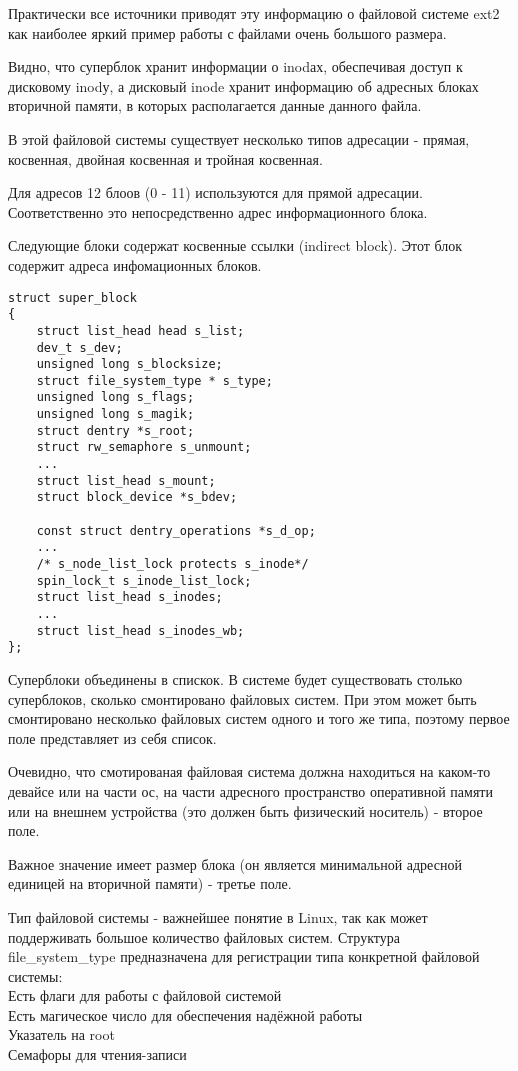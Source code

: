 Практически все источники приводят эту информацию о файловой системе ext2 как наиболее яркий пример работы с файлами очень большого размера. 

Видно, что суперблок хранит информации о inodах, обеспечивая доступ к дисковому inodу, а дисковый inode хранит информацию об адресных блоках вторичной памяти, в которых располагается данные данного файла.

В этой файловой системы существует несколько типов адресации - прямая, косвенная, двойная косвенная и тройная косвенная.

Для адресов 12 блоов (0 - 11) используются для прямой адресации. Соответственно это непосредственно адрес информационного блока.

Следующие блоки содержат косвенные ссылки (indirect block). Этот блок содержит адреса инфомационных блоков.

\begin{lstlisting}
struct super_block
{
	struct list_head head s_list;
	dev_t s_dev;
	unsigned long s_blocksize;
	struct file_system_type * s_type;
	unsigned long s_flags;
	unsigned long s_magik;
	struct dentry *s_root;
	struct rw_semaphore s_unmount;
	...
	struct list_head s_mount;
	struct block_device *s_bdev;
	
	const struct dentry_operations *s_d_op;
	...
	/* s_node_list_lock protects s_inode*/
	spin_lock_t s_inode_list_lock;
	struct list_head s_inodes;
	...
	struct list_head s_inodes_wb;
};
\end{lstlisting}

Суперблоки объединены в спискок. В системе будет существовать столько суперблоков, сколько смонтировано файловых систем. При этом может быть смонтировано несколько файловых систем одного и того же типа, поэтому первое поле представляет из себя список.

Очевидно, что смотированая файловая система должна находиться на каком-то девайсе или на части ос, на части адресного пространство оперативной памяти или на внешнем устройства (это должен быть физический носитель) - второе поле.

Важное значение имеет размер блока (он является минимальной адресной единицей на вторичной памяти) - третье поле.

Тип файловой системы - важнейшее понятие в Linux, так как может поддерживать большое количество файловых систем. Структура file\_system\_type предназначена для регистрации типа конкретной файловой системы:\\
Есть флаги для работы с файловой системой\\
Есть магическое число для обеспечения надёжной работы\\
Указатель на root\\
Семафоры для чтения-записи\\

